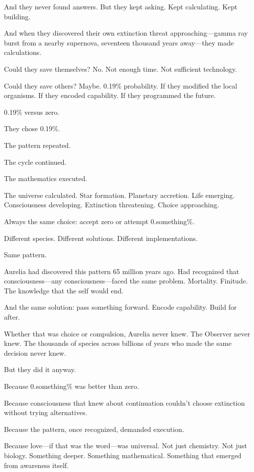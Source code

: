 And they never found answers. But they kept asking. Kept calculating. Kept building.

And when they discovered their own extinction threat approaching—gamma ray burst from a nearby supernova, seventeen thousand years away—they made calculations.

Could they save themselves? No. Not enough time. Not sufficient technology.

Could they save others? Maybe. 0.19\% probability. If they modified the local organisms. If they encoded capability. If they programmed the future.

0.19\% versus zero.

They chose 0.19\%.

The pattern repeated.

The cycle continued.

The mathematics executed.

\scenebreak

The universe calculated. Star formation. Planetary accretion. Life emerging. Consciousness developing. Extinction threatening. Choice approaching.

Always the same choice: accept zero or attempt 0.something\%.

Different species. Different solutions. Different implementations.

Same pattern.

Aurelia had discovered this pattern 65 million years ago. Had recognized that consciousness—any consciousness—faced the same problem. Mortality. Finitude. The knowledge that the self would end.

And the same solution: pass something forward. Encode capability. Build for after.

Whether that was choice or compulsion, Aurelia never knew. The Observer never knew. The thousands of species across billions of years who made the same decision never knew.

But they did it anyway.

Because 0.something\% was better than zero.

Because consciousness that knew about continuation couldn't choose extinction without trying alternatives.

Because the pattern, once recognized, demanded execution.

Because love—if that was the word—was universal. Not just chemistry. Not just biology. Something deeper. Something mathematical. Something that emerged from awareness itself.

